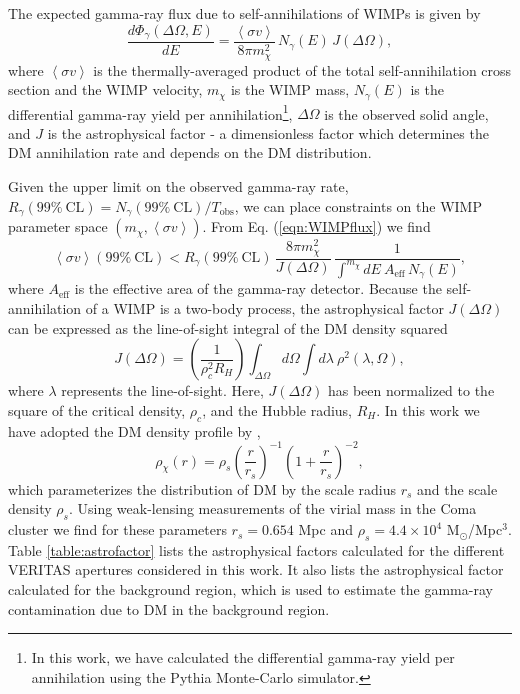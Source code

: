 \documentclass[12pt,manuscript]{aastex}
\newcommand{\expval}[1]{\left\langle #1 \right\rangle}
\begin{document}
The expected gamma-ray flux due to self-annihilations of WIMPs is given by
\begin{equation}
\frac{d\Phi_{\gamma}(\Delta\Omega,E)}{dE}=
\frac{\expval{\sigma v}}{8\pi m_{\chi}^{2}}\,N_\gamma (E)\, J(\Delta\Omega),
\label{eqn:WIMPflux}
\end{equation}
where $\expval{\sigma v}$ is the thermally-averaged product of the total self-annihilation cross
section and the WIMP velocity, $m_{\chi}$ is the WIMP mass, $N_\gamma (E)$ is the differential
gamma-ray yield per annihilation\footnote{In this work, we have calculated the differential
gamma-ray yield per annihilation using the Pythia Monte-Carlo simulator.}, $\Delta\Omega$ is the
observed solid angle, and $J$ is the astrophysical factor - a dimensionless factor which determines
the DM annihilation rate and depends on the DM distribution.

Given the upper limit on the observed gamma-ray rate,
$R_{\gamma}(99\%\ \mathrm{CL}) = N_{\gamma}(99\%\ \mathrm{CL}) / T_{\mathrm{obs}}$, we can place
constraints on the WIMP parameter space $(m_{\chi}, \expval{\sigma v})$. From Eq.
(\ref{eqn:WIMPflux}) we find
\begin{equation}
\expval{\sigma v}(99\%\ \mathrm{CL}) <
R_{\gamma}(99\%\ \mathrm{CL})\, \frac{8\pi m_{\chi}^{2}}{J(\Delta\Omega)}\,
\frac{1}{\int^{m_{\chi}} dE\ A_{\mathrm{eff}}\,N_\gamma (E)},
\end{equation}
where $A_{\mathrm{eff}}$ is the effective area of the gamma-ray detector.
Because the self-annihilation of a WIMP is a two-body process, the astrophysical factor
$J(\Delta\Omega)$ can be expressed as the line-of-sight integral of the DM density squared
\begin{equation}
J(\Delta\Omega)=\left(\frac{1}{\rho_{c}^{2}R_{H}}\right)
\int_{\Delta\Omega}d\Omega\int d\lambda\ \rho^{2}(\lambda,\Omega),
\end{equation}
where $\lambda$ represents the line-of-sight. Here,
$J(\Delta\Omega)$ has been normalized to the square of the critical density, $\rho_{c}$, and the
Hubble radius, $R_{H}$. In this work we have adopted the DM density profile by
\citet{article:NavarroFrenkWhite:1997},
\begin{equation}
\rho_{\chi}(r)=\rho_{s}\left(\frac{r}{r_{s}}\right)^{-1}\left(1+\frac{r}{r_{s}}\right)^{-2},
\end{equation}
which parameterizes the distribution of DM by the scale radius $r_{s}$ and the scale density
$\rho_{s}$. Using weak-lensing measurements of the virial mass in the Coma cluster
\citep{article:Gavazzi_etal:2009} we find for these parameters $r_{s}=0.654$ Mpc and
$\rho_{s}=4.4\times 10^{4}$ M$_{\odot}$/Mpc$^{3}$. Table \ref{table:astrofactor} lists the
astrophysical factors calculated for the different VERITAS apertures considered in this work.
It also lists the astrophysical factor calculated for the background region, which is used
to estimate the gamma-ray contamination due to DM in the background region.
\end{document}
